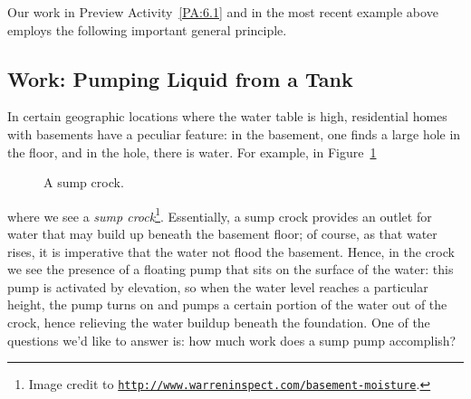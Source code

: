 Our work in Preview Activity~\ref{PA:6.1} and in the most recent example above employs the following important general principle.

\vspace*{5pt}
\nin {}
\vspace*{1pt}



\subsection*{Work: Pumping Liquid from a Tank}

In certain geographic locations where the water table is high, residential homes with basements have a peculiar feature:  in the basement, one finds a large hole in the floor, and in the hole, there is water.  For example, in Figure~\ref{F:6.4.SumpCrock} 
\begin{figure}[h]
\begin{center}
\caption{A sump crock.} \label{F:6.4.SumpCrock}
\end{center}
\end{figure}
where we see a \emph{sump crock}\footnote{Image credit to \href{http://www.warreninspect.com/basement-moisture}{\texttt{http://www.warreninspect.com/basement-moisture}}.}.  Essentially, a sump crock provides an outlet for water that may build up beneath the basement floor; of course, as that water rises, it is imperative that the water not flood the basement.  Hence, in the crock we see the presence of a floating pump that sits on the surface of the water:  this pump is activated by elevation, so when the water level reaches a particular height, the pump turns on and pumps a certain portion of the water out of the crock, hence relieving the water buildup beneath the foundation.  One of the questions we'd like to answer is:  how much work does a sump pump accomplish?


